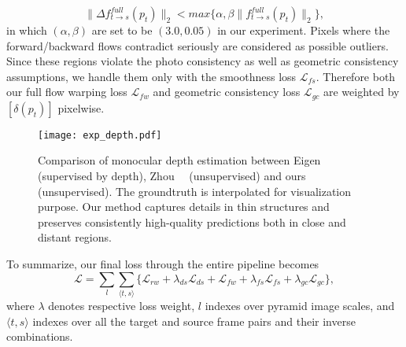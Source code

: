 \documentclass[10pt,twocolumn,letterpaper]{article}
\newcommand{\jpshi}[1]{{{\color{blue} Jianping: #1}}}
\newcommand{\yinzc}[1]{{{\color{cyan} Zhichao: #1}}}
\begin{document}
\begin{equation}
\|\Delta f_{t\to s}^{full}(p_t)\|_2<max\{\alpha, \beta\|f_{t\to s}^{full}(p_t)\|_2\},
\end{equation}
in which $(\alpha,\beta)$ are set to be $(3.0,0.05)$ in our experiment. 
Pixels where the forward/backward flows contradict seriously are considered as possible outliers. Since these regions violate the photo consistency as well as geometric consistency assumptions, we handle them only with the smoothness loss $\mathcal{L}_{fs}$. 
Therefore both our full flow warping loss $\mathcal{L}_{fw}$ and geometric consistency loss $\mathcal{L}_{gc}$ are weighted by $[\delta(p_t)]$ pixelwise.

\iffalse\begin{equation}
\mathcal{L}_{t\to s}^{fw}=\sum_{p_t\in I_t}P_{t\to s}^{noc}(p_t)\mathcal{C}(I_t,\tilde{I}_s^{fin})(p_t)
\end{equation}\begin{equation}
\mathcal{L}_{t\to s}^{fc}=\sum_{p_t\in I_t}P_{t\to s}^{noc}(p_t)|\Delta f_{t\to s}(p_t)|
\end{equation}\fi\begin{figure*}[t]
\begin{center}
   \texttt{[image: exp\_depth.pdf]}
\end{center}
\vspace{-1ex}
   \caption{Comparison of monocular depth estimation between Eigen~\etal~\cite{EigenPF14} (supervised by depth), Zhou~\etal~\cite{zhou2017unsupervised} (unsupervised) and ours (unsupervised). The groundtruth is interpolated for visualization purpose. Our method captures details in thin structures and preserves consistently high-quality predictions both in close and distant regions.}
   \vspace{-2ex}
\label{fig::exp_depth}
\end{figure*}%

To summarize, our final loss through the entire pipeline becomes
\begin{equation}
\mathcal{L}=\sum_{l}\sum_{\langle t,s \rangle}\{\mathcal{L}_{rw}+\lambda_{ds}\mathcal{L}_{ds}+\mathcal{L}_{fw}+\lambda_{fs}\mathcal{L}_{fs}+\lambda_{gc}\mathcal{L}_{gc}\},
\end{equation}
where $\lambda$ denotes respective loss weight, $l$ indexes over pyramid image scales, and $\langle t,s \rangle$ indexes over all the target and source frame pairs and their inverse combinations. %
\vspace{-1ex}
\end{document}
